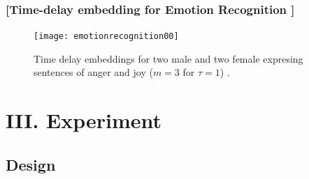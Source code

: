 \documentclass{beamer}
\begin{document}
\begin{frame}
\frametitle{[Time-delay embedding for Emotion Recognition ] }
\vspace{-0.7cm}


\begin{figure}[!htb]
\centering    
\texttt{[image: emotionrecognition00]}
\caption[PA]{Time delay embeddings for two male and two female
expresing sentences of anger and joy ($m=3$ for $\tau=1$) \textcolor{red}{\textbf{  \cite{Harimi2015} }}. }
  
\label{fig:sn}
\end{figure}



\end{frame}



% 
%  
%   
%  
% 
%  
%  

 
 

\section{III. Experiment}
 
\subsection{Design}
 
 

 
\end{document}
